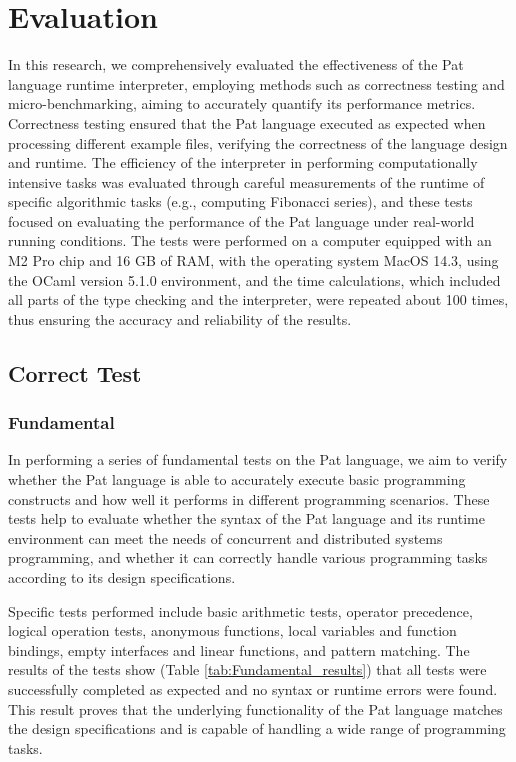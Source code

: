 \documentclass{l4proj}
\begin{document}
\chapter{Evaluation} 
In this research, we comprehensively evaluated the effectiveness of the Pat language runtime interpreter, employing methods such as correctness testing and micro-benchmarking, aiming to accurately quantify its performance metrics. Correctness testing ensured that the Pat language executed as expected when processing different example files, verifying the correctness of the language design and runtime. The efficiency of the interpreter in performing computationally intensive tasks was evaluated through careful measurements of the runtime of specific algorithmic tasks (e.g., computing Fibonacci series), and these tests focused on evaluating the performance of the Pat language under real-world running conditions. The tests were performed on a computer equipped with an M2 Pro chip and 16 GB of RAM, with the operating system MacOS 14.3, using the OCaml version 5.1.0 environment, and the time calculations, which included all parts of the type checking and the interpreter, were repeated about 100 times, thus ensuring the accuracy and reliability of the results.

\section{Correct Test}

\subsection{Fundamental}
In performing a series of fundamental tests on the Pat language, we aim to verify whether the Pat language is able to accurately execute basic programming constructs and how well it performs in different programming scenarios. These tests help to evaluate whether the syntax of the Pat language and its runtime environment can meet the needs of concurrent and distributed systems programming, and whether it can correctly handle various programming tasks according to its design specifications.

Specific tests performed include basic arithmetic tests, operator precedence, logical operation tests, anonymous functions, local variables and function bindings, empty interfaces and linear functions, and pattern matching. The results of the tests show (Table \ref{tab:Fundamental_results}) that all tests were successfully completed as expected and no syntax or runtime errors were found. This result proves that the underlying functionality of the Pat language matches the design specifications and is capable of handling a wide range of programming tasks.
\end{document}

